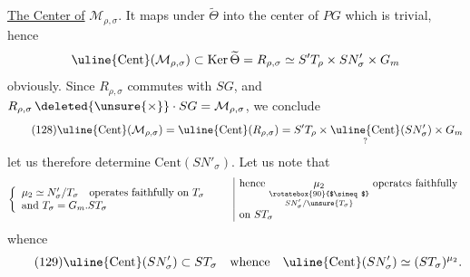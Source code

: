 
\uline{The Center of} $\mathcal M_{\rho,\sigma}$. It maps under $\widetilde\Theta$ into the center of $PG$ which is trivial, hence
\[
\uline{\mathrm{Cent}}(\mathcal M_{\rho,\sigma})\subset\operatorname{Ker}\widetilde\Theta
=R_{\rho,\sigma}\simeq S'T_\rho\times SN'_\sigma\times G_m
\]
 obviously. Since $R_{\rho,\sigma}$ commutes with $SG$, and $R_{\rho,\sigma}\,\deleted{\unsure{\times}}\cdot SG=\mathcal M_{\rho,\sigma}$, we conclude
\[
\tag{128}
\uline{\mathrm{Cent}}(\mathcal M_{\rho,\sigma})
=\uline{\mathrm{Cent}}(R_{\rho,\sigma})
=S'T_\rho\times\underset{?}{\uline{\mathrm{Cent}}}(SN'_\sigma)\times G_m
\]
let us therefore determine $\mathrm{Cent}(SN'_\sigma)$. Let us note that
\[
\left\{\begin{array}{l}
\mu_2\simeq N'_\sigma/T_\sigma\quad\text{operates faithfully on }T_\sigma\\
\text{and }T_\sigma=G_m.ST_\sigma
\end{array}\right.
\qquad
\begin{array}{|l}
\text{hence }\underset{\substack{\rotatebox{90}{$\simeq$}\\SN'_\sigma/\unsure{T_\sigma}}}{\mu_2}\text{ operates faithfully}\\
\text{on }ST_\sigma
\end{array}
\]
whence
\[
\tag{129}
\uline{\mathrm{Cent}}(SN'_\sigma)\subset ST_\sigma
\quad\text{whence}\quad
\uline{\mathrm{Cent}}(SN'_\sigma)\simeq(ST_\sigma)^{\mu_2}.
\]

